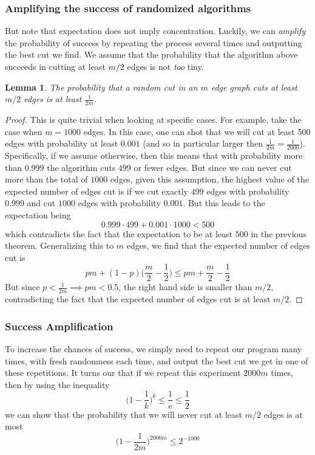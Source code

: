 \documentclass[a4paper, 12pt]{report}
\newtheorem{lemma}[theorem]{Lemma}
\theoremstyle{remark}
\theoremstyle{definition}
\begin{document}
\subsubsection{Amplifying the success of randomized algorithms}
But note that expectation does not imply concentration. Luckily, we can \textit{amplify} the probability of success by repeating the process several times and outputting the best cut we find. We assume that the probability that the algorithm above succeeds in cutting at least $m/2$ edges is not \textit{too} tiny. 

\begin{lemma}
The probability that a random cut in an $m$ edge graph cuts at least $m/2$ edges is at least $\frac{1}{2m}$. 
\end{lemma}
\begin{proof}
This is quite trivial when looking at specific cases. For example, take the case when $m =1000$ edges. In this case, one can shot that we will cut at least 500 edges with probability at least $0.001$ (and so in particular larger then $\frac{1}{2m} = \frac{1}{2000}$). Specifically, if we assume otherwise, then this means that with probability more than $0.999$ the algorithm cuts $499$ or fewer edges. But since we can never cut more than the total of $1000$ edges, given this assumption, the highest value of the expected number of edges cut is if we cut exactly $499$ edges with probability $0.999$ and cut $1000$ edges with probability $0.001$. But this leads to the expectation being
\[0.999 \cdot 499 + 0.001 \cdot 1000 < 500\]
which contradicts the fact that the expectation to be at least $500$ in the previous theorem. Generalizing this to $m$ edges, we find that the expected number of edges cut is 
\[pm + (1-p) \Big( \frac{m}{2} - \frac{1}{2} \Big) \leq pm + \frac{m}{2} - \frac{1}{2}\]
But since $p < \frac{1}{2m} \implies pm < 0.5$, the right hand side is smaller than $m/2$, contradicting the fact that the expected number of edges cut is at least $m/2$. 
\end{proof}

\subsubsection{Success Amplification}
To increase the chances of success, we simply need to repeat our program many times, with fresh randomness each time, and output the best cut we get in one of these repetitions. It turns our that if we repeat this experiment $2000m$ times, then by using the inequality
\[\Big( 1 - \frac{1}{k} \Big)^k \leq \frac{1}{e} \leq \frac{1}{2}\]
we can show that the probability that we will never cut at least $m/2$ edges is at most 
\[\Big( 1 - \frac{1}{2m} \Big)^{2000m} \leq 2^{-1000}\]
\end{document}
